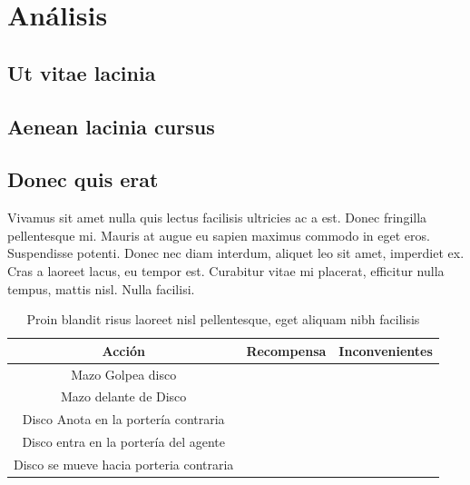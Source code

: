 \chapter{Análisis}

\section{Ut vitae lacinia}


\section{Aenean lacinia cursus}

\section{Donec quis erat}
Vivamus sit amet nulla quis lectus facilisis ultricies ac a est. Donec fringilla pellentesque mi. Mauris at augue eu sapien maximus commodo in eget eros. Suspendisse potenti. Donec nec diam interdum, aliquet leo sit amet, imperdiet ex. Cras a laoreet lacus, eu tempor est. Curabitur vitae mi placerat, efficitur nulla tempus, mattis nisl. Nulla facilisi. 
\begin{table}[H]
\centering
\begin{tabular}{| c | c | c|} 
 \hline
 \textbf{Acción} & \textbf{Recompensa} & \textbf{Inconvenientes}\\ [0.3ex] 
 \hline 
 Mazo Golpea disco &  &   \\ 
 \hline
 Mazo delante de Disco & &  \\
 \hline
 Disco Anota en la portería contraria &  &  \\
 \hline 
 Disco entra en la portería del agente &  &   \\ %
 \hline 
 Disco se mueve hacia porteria contraria &  &   \\ %
 \hline
\end{tabular}
\caption[Movimientos Básicos Programados]
	{Proin blandit risus laoreet nisl pellentesque, eget aliquam nibh facilisis}
\label{table:movimientos_basicos}
\end{table}


\afterpage{\blankpage}